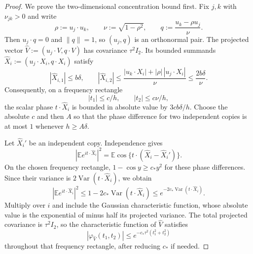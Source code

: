 \documentclass[11pt,letterpaper]{article}
\theoremstyle{remark}
\newcommand{\E}{\mathbb E}
\newcommand{\Var}{\operatorname{Var}}
\begin{document}
\begin{proof}
We prove the two-dimensional concentration bound first. Fix
$j,k$ with $\nu_{jk}>0$ and write
\[
 \rho:=u_j\cdot u_k,\qquad \nu:=\sqrt{1-\rho^2},\qquad
 q:=\frac{u_k-\rho u_j}{\nu}.
\]
Then $u_j\cdot q=0$ and $\|q\|=1$, so $(u_j,q)$ is an
orthonormal pair. The projected vector
$\widehat V:=(u_j\cdot V,q\cdot V)$ has covariance
$\tau^2I_2$. Its bounded summands
$\widehat X_i:=(u_j\cdot X_i,q\cdot X_i)$ satisfy
\[
 |\widehat X_{i,1}|\le b\delta,
 \qquad
 |\widehat X_{i,2}|
 \le\frac{|u_k\cdot X_i|+|\rho|\,|u_j\cdot X_i|}{\nu}
 \le\frac{2b\delta}{\nu}.
\]
Consequently, on a frequency rectangle
\[
 |t_1|\le c/h,\qquad |t_2|\le c\nu/h,
\]
the scalar phase $t\cdot\widehat X_i$ is bounded in absolute
value by $3cb\delta/h$. Choose the absolute $c$ and then $A$
so that the phase difference for two independent copies is at
most $1$ whenever $h\ge A\delta$.

Let $\widehat X_i'$ be an independent copy. Independence gives
\[
 \left|\E e^{it\cdot\widehat X_i}\right|^2
 =\E\cos\{t\cdot(\widehat X_i-\widehat X_i')\}.
\]
On the chosen frequency rectangle, $1-\cos y\ge c_*y^2$
for these phase differences. Since their variance is
$2\Var(t\cdot\widehat X_i)$, we obtain
\[
 \left|\E e^{it\cdot\widehat X_i}\right|^2
 \le1-2c_*\Var(t\cdot\widehat X_i)
 \le e^{-2c_*\Var(t\cdot\widehat X_i)}.
\]
Multiply over $i$ and include the Gaussian characteristic
function, whose absolute value is the exponential of minus half
its projected variance. The total projected covariance is
$\tau^2I_2$, so the characteristic function of $\widehat V$
satisfies
\[
 |\varphi_{\widehat V}(t_1,t_2)|
 \le e^{-c_*\tau^2(t_1^2+t_2^2)}
\]
throughout that frequency rectangle, after reducing $c_*$ if needed.


\end{proof}
\end{document}
